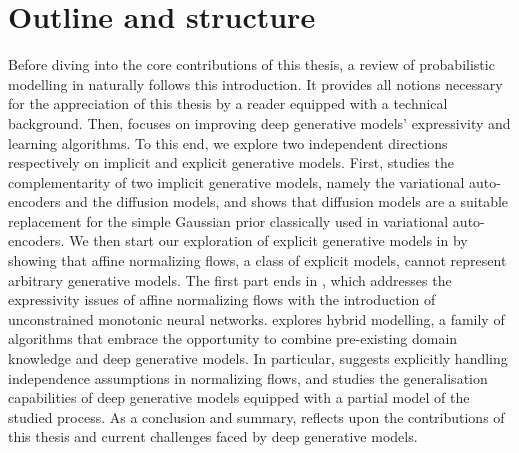 \section{Outline and structure}

Before diving into the core contributions of this thesis, a review of probabilistic modelling in  naturally follows this introduction. It provides all notions necessary for the appreciation of this thesis by a reader equipped with a technical background. Then,  focuses on improving deep generative models' expressivity and learning algorithms. To this end, we explore two independent directions respectively on implicit and explicit generative models. First,  studies the complementarity of two implicit generative models, namely the variational auto-encoders and the diffusion models, and shows that diffusion models are a suitable replacement for the simple Gaussian prior classically used in variational auto-encoders. We then start our exploration of explicit generative models in  by showing that affine normalizing flows, a class of explicit models, cannot represent arbitrary generative models. The first part ends in , which addresses the expressivity issues of affine normalizing flows with the introduction of unconstrained monotonic neural networks.  explores hybrid modelling, a family of algorithms that embrace the opportunity to combine pre-existing domain knowledge and deep generative models. In particular,  suggests explicitly handling independence assumptions in normalizing flows, and  studies the generalisation capabilities of deep generative models equipped with a partial model of the studied process. As a conclusion and summary,  reflects upon the contributions of this thesis and current challenges faced by deep generative models.




